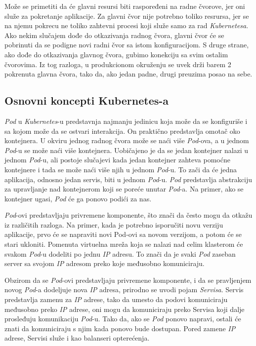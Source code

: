 Može se primetiti da će glavni resursi biti raspoređeni na radne čvorove, jer oni služe za pokretanje 
aplikacije. Za glavni čvor nije potrebno toliko resrursa, jer se na njemu pokrecu ne toliko zahtevni procesi 
koji služe samo za rad \textit{Kubernetesa}. Ako nekim slučajem dođe do otkazivanja radnog čvora, glavni čvor 
će se pobrinuti da se podigne novi radni čvor sa istom konfiguracijom. S druge strane, ako dođe do 
otkazivanja glavnog čvora, gubimo konekciju sa svim ostalim čvorovima. Iz tog razloga, u produkcionom 
okruženju se uvek drži barem 2 pokrenuta glavna čvora, tako da, ako jedan padne, drugi preuzima 
posao na sebe.

\subsection{Osnovni koncepti Kubernetes-a}
{\em Pod} u \textit{Kubernetes}-u predstavnja najmanju jedinicu koja može da se konfiguriše i sa kojom može da 
se ostvari interakcija. On praktično predstavlja omotač oko kontejnera. U okviru jednog radnog čvora 
može se naći više \textit{Pod}-ova, a u jednom \textit{Pod}-u se može naći više kontejnera. Uobičajeno je da se jedan 
kontejner nalazi u jednom \textit{Pod}-u, ali postoje slučajevi kada jedan kontejner zahteva pomoćne kontejnere 
i tada se može naći više njih u jednom \textit{Pod}-u. To zači da će jedna aplikacija, odnosno jedan servis, 
biti u jednom \textit{Pod}-u. \textit{Pod} predstavlja abstrakciju za upravljanje nad kontejnerom koji se poreće unutar
\textit{Pod}-a. Na primer, ako se kontejner ugasi, \textit{Pod} će ga ponovo podići za nas. 

\textit{Pod}-ovi predstavljaju privremene komponente, što znači da često mogu da otkažu iz različitih razloga. 
Na primer, kada je potrebno isporučiti novu verziju aplikacije, prvo će se napraviti novi Pod-ovi sa 
novom verzijom, a potom će se stari ukloniti. Pomenuta virtuelna mreža koja se nalazi nad celim 
klasterom će svakom \textit{Pod}-u dodeliti po jednu \textit{IP} adresu. To znači da je svaki \textit{Pod} zaseban server sa 
svojom \textit{IP} adresom preko koje međusobno komuniciraju.

Obzirom da se \textit{Pod}-ovi predstavljaju privremene komponente, i da se pravljenjem novog \textit{Pod}-a dodeljuje 
nova \textit{IP} adresa, prirodno se uvodi pojam {\em Servisa}. Servis predstavlja zamenu za \textit{IP} adrese, tako 
da umesto da podovi komuniciraju međusobno preko \textit{IP} adrese, oni mogu da komuniciraju preko Servisa 
koji dalje prosleđuju komunikaciju \textit{Pod}-u. Tako da, ako se \textit{Pod} ponovo napravi, ostali će znati da komuniciraju 
s njim kada ponovo bude dostupan. Pored zamene \textit{IP} adrese, Servisi služe i kao balanseri opterećenja. 

